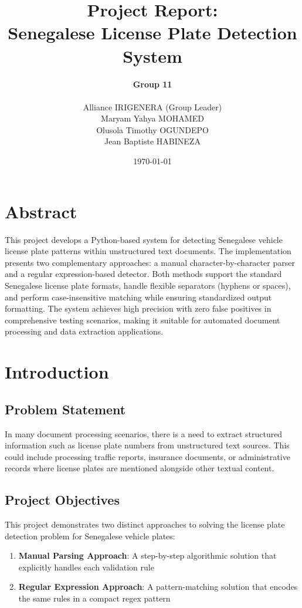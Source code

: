 \documentclass[12pt,a4paper]{article}
\title{Project Report:\\Senegalese License Plate Detection System}
\author{
    \textbf{Group 11}\\[0.8em]
    \begin{tabular}{c}
        Alliance IRIGENERA (Group Leader)\\
        Maryam Yahya MOHAMED\\
        Olusola Timothy OGUNDEPO\\
        Jean Baptiste HABINEZA
    \end{tabular}
}
\date{\today}
\begin{document}
\maketitle

\tableofcontents
\newpage

\section*{Abstract}
This project develops a Python-based system for detecting Senegalese vehicle license plate patterns within unstructured text documents. The implementation presents two complementary approaches: a manual character-by-character parser and a regular expression-based detector. Both methods support the standard Senegalese license plate formats, handle flexible separators (hyphens or spaces), and perform case-insensitive matching while ensuring standardized output formatting. The system achieves high precision with zero false positives in comprehensive testing scenarios, making it suitable for automated document processing and data extraction applications.

\section{Introduction}
\subsection{Problem Statement}
In many document processing scenarios, there is a need to extract structured information such as license plate numbers from unstructured text sources. This could include processing traffic reports, insurance documents, or administrative records where license plates are mentioned alongside other textual content.

\subsection{Project Objectives}
This project demonstrates two distinct approaches to solving the license plate detection problem for Senegalese vehicle plates:
\begin{enumerate}
    \item \textbf{Manual Parsing Approach}: A step-by-step algorithmic solution that explicitly handles each validation rule
    \item \textbf{Regular Expression Approach}: A pattern-matching solution that encodes the same rules in a compact regex pattern
\end{enumerate}
\end{document}

